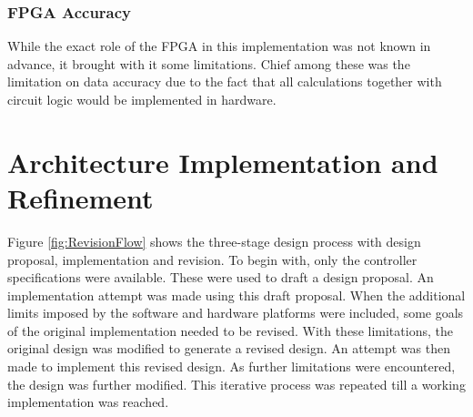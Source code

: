 \documentclass[conference]{IEEEtran}
\begin{document}
\subsubsection*{FPGA Accuracy}
While the exact role of the FPGA in this implementation was not known in advance, it brought with it some limitations. Chief among these was the limitation on data accuracy due to the fact that all calculations together with circuit logic would be implemented in hardware.
\section{Architecture Implementation and Refinement}
Figure \ref{fig:RevisionFlow} shows the three-stage design process with design proposal, implementation and revision. To begin with, only the controller specifications were available. These were used to draft a design proposal. An implementation attempt was made using this draft proposal. When the additional limits imposed by the software and hardware platforms were included, some goals of the original implementation needed to be revised. With these limitations, the original design was modified to generate a revised design. An attempt was then made to implement this revised design. As further limitations were encountered, the design was further modified. This iterative process was repeated till a working implementation was reached.
\end{document}
